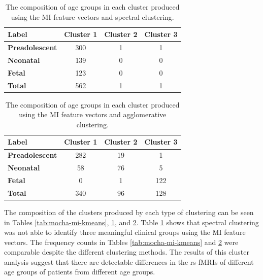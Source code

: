 \begin{table}[]
\centering
\caption{The composition of age groups in each cluster produced using the MI feature vectors and spectral clustering.}
\label{tab:mocha-mi-spectral}
\begin{tabular}{|l|c|c|c|}
\hline
\textbf{Label} & \multicolumn{1}{l|}{\textbf{Cluster 1}} & \multicolumn{1}{l|}{\textbf{Cluster 2}} & \multicolumn{1}{l|}{\textbf{Cluster 3}} \\ \hline
\textbf{Preadolescent} & 300 & 1 & 1 \\ \hline
\textbf{Neonatal}      & 139 & 0 & 0 \\ \hline
\textbf{Fetal}         & 123 & 0 & 0 \\ \hline
\textbf{Total}         & 562 & 1 & 1 \\ \hline
\end{tabular}
\end{table}

\begin{table}[]
\centering
\caption{The composition of age groups in each cluster produced using the MI feature vectors and agglomerative clustering.}
\label{tab:mocha-mi-agg}
\begin{tabular}{|l|c|c|c|}
\hline
\textbf{Label} & \multicolumn{1}{l|}{\textbf{Cluster 1}} & \multicolumn{1}{l|}{\textbf{Cluster 2}} & \multicolumn{1}{l|}{\textbf{Cluster 3}} \\ \hline
\textbf{Preadolescent} & 282 & 19 & 1   \\ \hline
\textbf{Neonatal}      & 58  & 76 & 5   \\ \hline
\textbf{Fetal}         & 0   & 1  & 122 \\ \hline
\textbf{Total}         & 340 & 96 & 128 \\ \hline
\end{tabular}
\end{table}

The composition of the clusters produced by each type of clustering can be seen in Tables \ref{tab:mocha-mi-kmeans}, \ref{tab:mocha-mi-spectral}, and \ref{tab:mocha-mi-agg}. Table \ref{tab:mocha-mi-spectral} shows that spectral clustering was not able to identify three meaningful clinical groups using the MI feature vectors. The frequency counts in Tables \ref{tab:mocha-mi-kmeans} and \ref{tab:mocha-mi-agg} were comparable despite the different clustering methods. The results of this cluster analysis suggest that there are detectable differences in the rs-fMRIs of different age groups of patients from different age groups.

